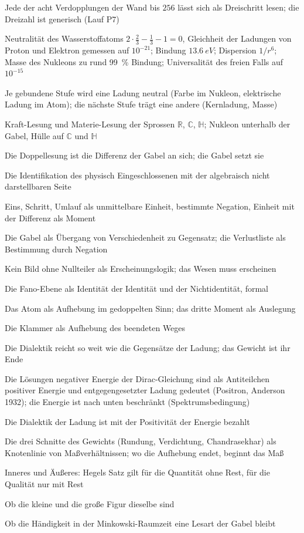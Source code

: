 \documentclass[11pt,a4paper]{article}
\newcommand{\R}{\mathbb R}
\newcommand{\C}{\mathbb C}
\newcommand{\HH}{\mathbb H}
\begin{document}
\begin{description}[itemsep=1pt,font=\normalfont\bfseries]
\item[Satz:] Jede der acht Verdopplungen der Wand bis $256$ lässt sich als Dreischritt lesen; die Dreizahl ist generisch (Lauf P7)
\item[Befund:] Neutralität des Wasserstoffatoms $2\cdot\tfrac23-\tfrac13-1=0$, Gleichheit der Ladungen von Proton und Elektron gemessen auf $10^{-21}$; Bindung $\SI{13.6}{eV}$; Dispersion $1/r^6$; Masse des Nukleons zu rund \SI{99}{\percent} Bindung; Universalität des freien Falls auf $10^{-15}$
\item[Befund:] Je gebundene Stufe wird eine Ladung neutral (Farbe im Nukleon, elektrische Ladung im Atom); die nächste Stufe trägt eine andere (Kernladung, Masse)
\item[These:] Kraft-Lesung und Materie-Lesung der Sprossen $\R$, $\C$, $\HH$; Nukleon unterhalb der Gabel, Hülle auf $\C$ und $\HH$
\item[These:] Die Doppellesung ist die Differenz der Gabel an sich; die Gabel setzt sie
\item[These:] Die Identifikation des physisch Eingeschlossenen mit der algebraisch nicht darstellbaren Seite
\item[Deutung:] Eins, Schritt, Umlauf als unmittelbare Einheit, bestimmte Negation, Einheit mit der Differenz als Moment
\item[Deutung:] Die Gabel als Übergang von Verschiedenheit zu Gegensatz; die Verlustliste als Bestimmung durch Negation
\item[Deutung:] Kein Bild ohne Nullteiler als Erscheinungslogik; das Wesen muss erscheinen
\item[Deutung:] Die Fano-Ebene als Identität der Identität und der Nichtidentität, formal
\item[Deutung:] Das Atom als Aufhebung im gedoppelten Sinn; das dritte Moment als Auslegung
\item[Deutung:] Die Klammer als Aufhebung des beendeten Weges
\item[Deutung:] Die Dialektik reicht so weit wie die Gegensätze der Ladung; das Gewicht ist ihr Ende
\item[Befund:] Die Lösungen negativer Energie der Dirac-Gleichung sind als Antiteilchen positiver Energie und entgegengesetzter Ladung gedeutet (Positron, Anderson 1932); die Energie ist nach unten beschränkt (Spektrumsbedingung)
\item[Deutung:] Die Dialektik der Ladung ist mit der Positivität der Energie bezahlt
\item[Deutung:] Die drei Schnitte des Gewichts (Rundung, Verdichtung, Chandrasekhar) als Knotenlinie von Maßverhältnissen; wo die Aufhebung endet, beginnt das Maß
\item[Deutung:] Inneres und Äußeres: Hegels Satz gilt für die Quantität ohne Rest, für die Qualität nur mit Rest
\item[Offen:] Ob die kleine und die große Figur dieselbe sind
\item[Offen:] Ob die Händigkeit in der Minkowski-Raumzeit eine Lesart der Gabel bleibt
\end{description}
\end{document}
